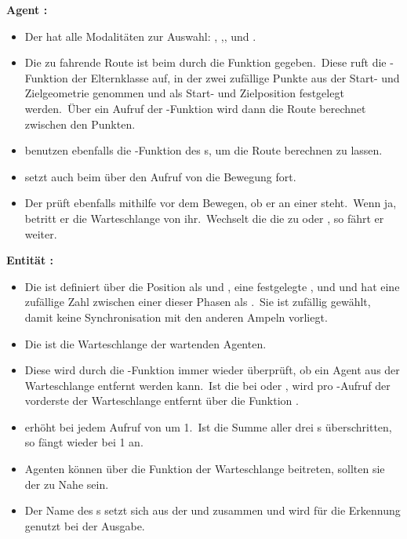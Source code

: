 \textbf{Agent :}
\begin{itemize}
    \item Der  hat alle Modalitäten zur Auswahl: , ,,  und .
    \item Die zu fahrende Route ist beim  durch die Funktion  gegeben.~Diese ruft die -Funktion der Elternklasse  auf, in der zwei zufällige Punkte aus der Start- und Zielgeometrie genommen und als Start- und Zielposition festgelegt werden.~Über ein Aufruf der -Funktion wird dann die Route berechnet zwischen den Punkten.
    \item {} benutzen ebenfalls die -Funktion des s, um die Route berechnen zu lassen.
    \item {} setzt auch beim  über den Aufruf von  die Bewegung fort.
    \item Der  prüft ebenfalls mithilfe  vor dem Bewegen, ob er an einer  steht.~Wenn ja, betritt er die Warteschlange von ihr.~Wechselt die  die  zu  oder , so fährt er weiter.
\end{itemize}

\textbf{Entität :}
\begin{itemize}
    \item Die  ist definiert über die Position als  und , eine festgelegte ,  und  und hat eine zufällige Zahl zwischen einer dieser Phasen als .~Sie ist zufällig gewählt, damit keine Synchronisation mit den anderen Ampeln vorliegt.
    \item Die  ist die Warteschlange der wartenden Agenten.
    \item Diese wird durch die -Funktion immer wieder überprüft, ob ein Agent aus der Warteschlange entfernt werden kann.~Ist die  bei  oder , wird pro -Aufruf der vorderste der Warteschlange entfernt über die Funktion .
    \item {} erhöht  bei jedem Aufruf von  um 1.~Ist die Summe aller drei s überschritten, so fängt  wieder bei 1 an.
    \item Agenten können über die Funktion  der Warteschlange beitreten, sollten sie der  zu Nahe sein.
    \item Der Name des s setzt sich aus der  und  zusammen und wird für die Erkennung genutzt bei der Ausgabe.
\end{itemize}


